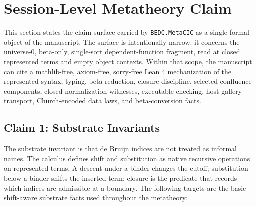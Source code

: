 \section{Session-Level Metatheory Claim}
\label{sec:session-metatheory-claim}

This section states the claim surface carried by \texttt{BEDC.MetaCIC} as a
single formal object of the manuscript.  The surface is intentionally narrow:
it concerns the universe-$0$, beta-only, single-sort dependent-function
fragment, read at closed represented terms and empty object contexts.  Within
that scope, the manuscript can cite a mathlib-free, axiom-free, sorry-free
Lean 4 mechanization of the represented syntax, typing, beta reduction,
closure discipline, selected confluence components, closed normalization
witnesses, executable checking, host-gallery transport, Church-encoded data
laws, and beta-conversion facts.

\begin{center}
\end{center}

\subsection{Claim 1: Substrate Invariants}
\label{subsec:claim-substrate-invariants}

The substrate invariant is that de Bruijn indices are not treated as informal
names.  The calculus defines shift and substitution as native recursive
operations on represented terms.  A descent under a binder changes the cutoff;
substitution below a binder shifts the inserted term; closure is the predicate
that records which indices are admissible at a boundary.  The following
targets are the basic shift-aware substrate facts used throughout the
metatheory:

